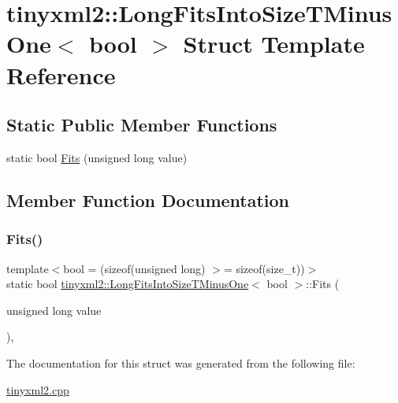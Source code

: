 \hypertarget{structtinyxml2_1_1_long_fits_into_size_t_minus_one}{}\section{tinyxml2\+:\+:Long\+Fits\+Into\+Size\+T\+Minus\+One$<$ bool $>$ Struct Template Reference}
\label{structtinyxml2_1_1_long_fits_into_size_t_minus_one}
\subsection*{Static Public Member Functions}
\begin{DoxyCompactItemize}
\item 
static bool \mbox{\hyperlink{structtinyxml2_1_1_long_fits_into_size_t_minus_one_a3057710104ab733963eb32fda0bc374c}{Fits}} (unsigned long value)
\end{DoxyCompactItemize}


\subsection{Member Function Documentation}
\mbox{\label{structtinyxml2_1_1_long_fits_into_size_t_minus_one_a3057710104ab733963eb32fda0bc374c}} 
\subsubsection{\texorpdfstring{Fits()}{Fits()}}
{\footnotesize\ttfamily template$<$bool  = (sizeof(unsigned long) $>$= sizeof(size\+\_\+t))$>$ \\
static bool \mbox{\hyperlink{structtinyxml2_1_1_long_fits_into_size_t_minus_one}{tinyxml2\+::\+Long\+Fits\+Into\+Size\+T\+Minus\+One}}$<$ bool $>$\+::Fits (\begin{DoxyParamCaption}\item[{unsigned long}]{value }\end{DoxyParamCaption})\hspace{0.3cm}{\ttfamily [inline]}, {\ttfamily [static]}}



The documentation for this struct was generated from the following file\+:\begin{DoxyCompactItemize}
\item 
\mbox{\hyperlink{tinyxml2_8cpp}{tinyxml2.\+cpp}}\end{DoxyCompactItemize}
